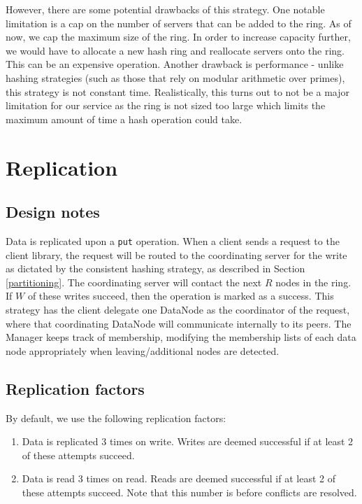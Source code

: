\documentclass[paper=a4,fontsize=11pt]{report} %
\numberwithin{equation}{section} %
\numberwithin{figure}{section} %
\numberwithin{table}{section} %
\begin{document}
However, there are some potential drawbacks of this strategy. One notable limitation is a cap on the number of servers that can be added to the ring. As of now, we cap the maximum size of the ring. In order to increase capacity further, we would have to allocate a new hash ring and reallocate servers onto the ring. This can be an expensive operation. Another drawback is performance - unlike hashing strategies (such as those that rely on modular arithmetic over primes), this strategy is not constant time. Realistically, this turns out to not be a major limitation for our service as the ring is not sized too large which limits the maximum amount of time a hash operation could take.

\section{Replication}
\subsection{Design notes}
Data is replicated upon a \texttt{put} operation. When a client sends a request to the client library, the request will be routed to the coordinating server for the write as dictated by the consistent hashing strategy, as described in Section \ref{partitioning}. The coordinating server will contact the next $R$ nodes in the ring. If $W$ of these writes succeed, then the operation is marked as a success. This strategy has the client delegate one DataNode as the coordinator of the request, where that coordinating DataNode will communicate internally to its peers. The Manager keeps track of membership, modifying the membership lists of each data node appropriately when leaving/additional nodes are detected.

\subsection{Replication factors}
By default, we use the following replication factors:
\begin{enumerate}
\item Data is replicated 3 times on write. Writes are deemed successful if at least 2 of these attempts succeed.
\item Data is read 3 times on read. Reads are deemed successful if at least 2 of these attempts succeed. Note that this number is before conflicts are resolved.
\end{enumerate}
\end{document}
